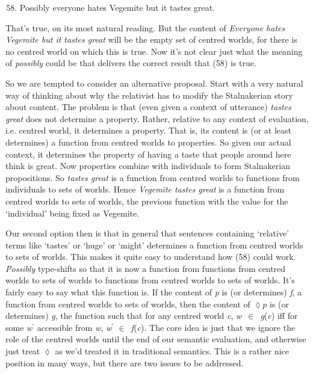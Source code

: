 \begin{enumerate}
\setcounter{enumi}{57} 
\item Possibly everyone hates Vegemite but it tastes great.
 \end{enumerate}

\noindent That's true, on its most natural reading. But the content of \textit{Everyone hates Vegemite but it tastes great} will be the empty set of centred worlds, for there is no centred world on which this is true. Now it's not clear just what the meaning of \textit{possibly} could be that delivers the correct result that (58) is true.
 
So we are tempted to consider an alternative proposal. Start with a very natural way of thinking about why the relativist has to modify the Stalnakerian story about content. The problem is that (even given a context of utterance) \textit{tastes great} does not determine a property. Rather, relative to any context of evaluation, i.e. centred world, it determines a property. That is, its content is (or at least determines) a function from centred worlds to properties. So given our actual context, it determines the property of having a taste that people around here think is great. Now properties combine with individuals to form Stalnakerian propositions. So \textit{tastes great} is a function from centred worlds to functions from individuals to sets of worlds. Hence \textit{Vegemite tastes great} is a function from centred worlds to sets of worlds, the previous function with the value for the `individual' being fixed as Vegemite.
 
Our second option then is that in general that sentences containing `relative' terms like `tastes' or `huge' or `might' determines a function from centred worlds to sets of worlds. This makes it quite easy to understand how (58) could work. \textit{Possibly} type-shifts so that it is now a function from functions from centred worlds to sets of worlds to functions from centred worlds to sets of worlds. It's fairly easy to say what this function is. If the content of \textit{p} is (or determines) \textit{f}, a function from centred worlds to sets of worlds, then the content of $\lozenge p$ is (or determines) \textit{g}, the function such that for any centred world \textit{c}, \textit{w}~${\in}$~\textit{g}(\textit{c}) iff for some \textit{w}$^\prime$ accessible from \textit{w}, \textit{w}$^\prime$ ${\in}$~\textit{f}(\textit{c}). The core idea is just that we ignore the role of the centred worlds until the end of our semantic evaluation, and otherwise just treat $\lozenge$ as we'd treated it in traditional semantics. This is a rather nice position in many ways, but there are two issues to be addressed. 
 
